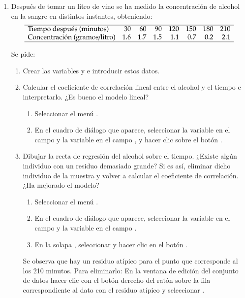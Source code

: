 \begin{enumerate}[leftmargin=*]
\item Después de tomar un litro de vino se ha medido la concentración de alcohol en la sangre en distintos instantes,
obteniendo:
\[
\begin{array}{lrrrrrrr}
\hline 
\mbox{Tiempo después (minutos)} & 30 & 60 & 90 & 120 & 150 & 180 & 210\\ 
\mbox{Concentración (gramos/litro)} & 1.6 & 1.7 & 1.5 & 1.1 & 0.7 & 0.2 & 2.1\\
\hline
\end{array}
\]

Se pide:
\begin{enumerate}
\item Crear las variables  y  e introducir estos datos.
\item Calcular el coeficiente de correlación lineal entre el alcohol y el tiempo e interpretarlo. ¿Es bueno el modelo
lineal? 
\begin{indicacion}
\begin{enumerate}
\item Seleccionar el menú .
\item En el cuadro de diálogo que aparece, seleccionar la variable  en el campo  y la variable  en el campo , y hacer clic sobre el botón
.
\end{enumerate}
\end{indicacion}

\item Dibujar la recta de regresión del alcohol sobre el tiempo. 
¿Existe algún individuo con un residuo demasiado grande? 
Si es así, eliminar dicho individuo de la muestra y volver a calcular el coeficiente de correlación. 
¿Ha mejorado el modelo?
\begin{indicacion}
\begin{enumerate}
\item Seleccionar el menú .
\item En el cuadro de diálogo que aparece, seleccionar la variable  en el campo  y
la variable  en el campo .
\item En la solapa , seleccionar  y hacer clic en el botón .
\end{enumerate}
Se observa que hay un residuo atípico para el punto que corresponde al los 210 minutos. 
Para eliminarlo:
En la ventana de edición del conjunto de datos hacer clic con el botón derecho del ratón sobre la fila correspondiente
al dato con el residuo atípico y seleccionar .
\end{indicacion}


\end{enumerate}
\end{enumerate}
